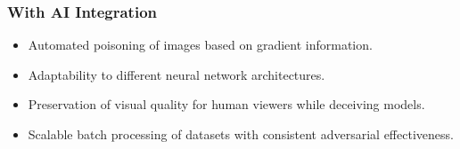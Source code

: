 \subsubsection{With AI Integration}
\begin{itemize}
    \item Automated poisoning of images based on gradient information.
    \item Adaptability to different neural network architectures.
    \item Preservation of visual quality for human viewers while deceiving models.
    \item Scalable batch processing of datasets with consistent adversarial effectiveness.
\end{itemize}
